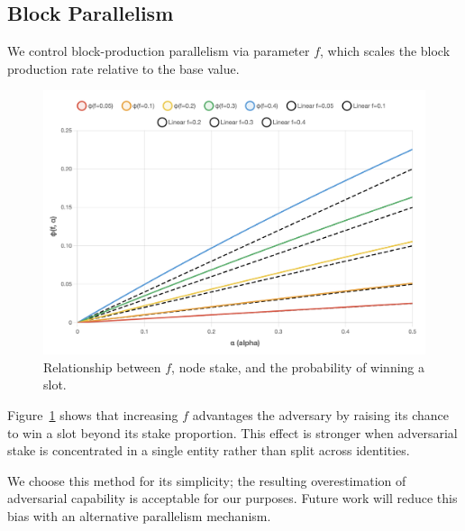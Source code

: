 \subsection{Block Parallelism}
We control block-production parallelism via parameter $f$, which scales the block production rate relative to the base value.
\begin{figure}
\includegraphics[width=\textwidth]{figs/f-parallelism-bias.png}
\caption{Relationship between $f$, node stake, and the probability of winning a slot.}
\label{fig:f-parallelism-bias}
\end{figure}
Figure~\ref{fig:f-parallelism-bias} shows that increasing $f$ advantages the adversary by raising its chance to win a slot beyond its stake proportion. This effect is stronger when adversarial stake is concentrated in a single entity rather than split across identities.


We choose this method for its simplicity; the resulting overestimation of adversarial capability is acceptable for our purposes. Future work will reduce this bias with an alternative parallelism mechanism.

